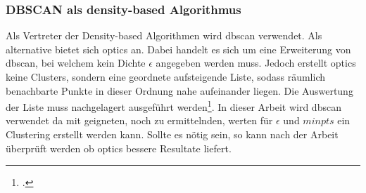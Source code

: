 \subsubsection{DBSCAN als density-based Algorithmus}
\label{sec:konzept:algorithmenauswahl:clustering:dbscan}
Als Vertreter der Density-based Algorithmen wird \gls{dbscan} verwendet. Als alternative bietet sich \gls{optics} an. Dabei handelt es sich um eine Erweiterung von \gls{dbscan}, bei welchem kein Dichte $\epsilon$ angegeben werden muss. Jedoch erstellt \gls{optics} keine Clusters, sondern eine geordnete aufsteigende Liste, sodass räumlich benachbarte Punkte in dieser Ordnung nahe aufeinander liegen. Die Auswertung der Liste muss nachgelagert ausgeführt werden\footcite{data_mining_concepts_and_techniques}. In dieser Arbeit wird \gls{dbscan} verwendet da mit geigneten, noch zu ermittelnden, werten für $\epsilon$ und $minpts$ ein Clustering erstellt werden kann. Sollte es nötig sein, so kann nach der Arbeit überprüft werden ob \gls{optics} bessere Resultate liefert.



